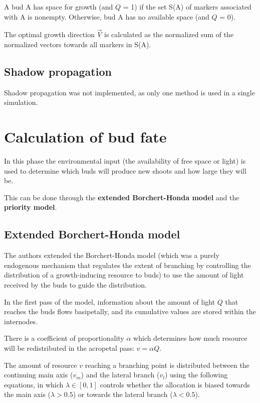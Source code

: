 \documentclass{article}
\begin{document}
A bud A has space for growth (and \(Q\) = 1) if the set S(A) of markers associated with A is nonempty. Otherwise, bud A has no available space (and \(Q\) = 0).

The optimal growth direction \(\vec{V}\) is calculated as the normalized sum of the normalized vectors towards all markers in S(A).

\subsection{Shadow propagation}

Shadow propagation was not implemented, as only one method is used in a single simulation.

\section{Calculation of bud fate}

In this phase the environmental input (the availability of free space or light) is used to determine which buds will produce new shoots and how large they will be.

This can be done through the \textbf{extended Borchert-Honda model} and the \textbf{priority model}.

\subsection{Extended Borchert-Honda model}

The authors extended the Borchert-Honda model (which was a purely endogenous mechanism that regulates the extent of branching by controlling the distribution of a growth-inducing resource to buds) to use the amount of light received by the buds to guide the distribution.

In the first pass of the model, information about the amount of light \(Q\) that reaches the buds flows basipetally, and its cumulative values are stored within the internodes.

There is a coefficient of proportionality \(\alpha\) which determines how much resource will be redistributed in the acropetal pass: \(v = \alpha Q\).

The amount of resource \(v\) reaching a branching point is distributed between the continuing main axis (\(v_m\)) and the lateral branch (\(v_l\)) using the following equations, in which \(\lambda \in [0, 1]\) controls whether the allocation is biased towards the main axis (\(\lambda > 0.5\)) or towards the lateral branch (\(\lambda < 0.5\)).
\end{document}
